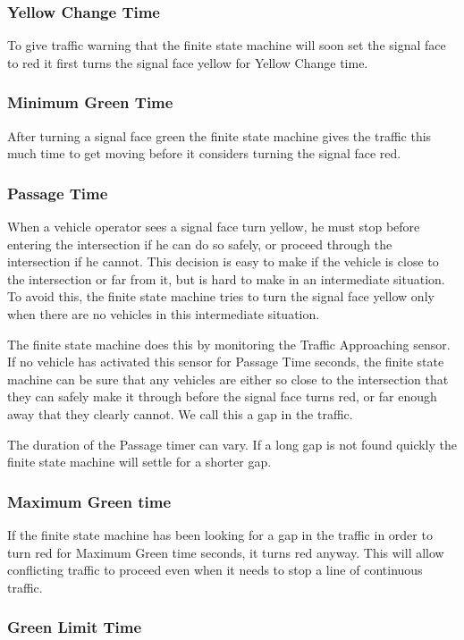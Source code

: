 \documentclass[letterpaper,twoside]{article}
\begin{document}
\subsubsection{Yellow Change Time}
To give traffic warning that the finite state machine will soon
set the signal face to red it first turns the signal face yellow
for Yellow Change time.

\subsubsection{Minimum Green Time}
After turning a signal face green the finite state machine
gives the traffic this much time to get moving before it considers
turning the signal face red.

\subsubsection{Passage Time}
When a vehicle operator sees a signal face turn yellow, he must stop
before entering the intersection if he can do so safely, or proceed
through the intersection if he cannot.  This decision is easy to make
if the vehicle is close to the intersection or far from it, but is hard
to make in an intermediate situation.  To avoid this, the finite state
machine tries to turn the signal face yellow only when there are no
vehicles in this intermediate situation.

The finite state machine does this by monitoring the Traffic Approaching
sensor.  If no vehicle has activated this sensor for Passage Time seconds,
the finite state machine can be sure that any vehicles are either so close
to the intersection that they can safely make it through before the signal
face turns red, or far enough away that they clearly cannot.
We call this a gap in the traffic.

The duration of the Passage timer can vary.  If a long gap is not found
quickly the finite state machine will settle for a shorter gap.

\subsubsection{Maximum Green time}
If the finite state machine has been looking for a gap in the traffic
in order to turn red for Maximum Green time seconds, it turns red
anyway.  This will allow conflicting traffic to proceed even when it needs
to stop a line of continuous traffic.

\subsubsection{Green Limit Time}
\end{document}
